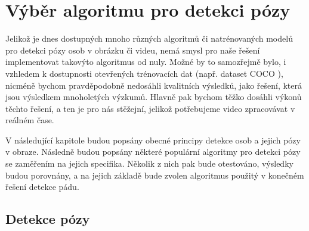 \chapter{Výběr algoritmu pro detekci pózy}
\label{chap:Pose}

Jelikož je dnes dostupných mnoho různých algoritmů či natrénovaných modelů pro
detekci pózy osob v obrázku či videu, nemá smysl pro naše řešení implementovat
takovýto algoritmus od nuly. Možné by to samozřejmě bylo, i vzhledem k
dostupnosti otevřených trénovacích dat (např. dataset COCO \cite{coco}),
nicméně bychom pravděpodobně nedosáhli kvalitních výsledků, jako řešení, která
jsou výsledkem mnoholetých výzkumů. Hlavně pak bychom těžko dosáhli výkonů
těchto řešení, a ten je pro nás stěžejní, jelikož potřebujeme video zpracovávat
v reálném čase.

V následující kapitole budou popsány obecné principy detekce osob a jejich pózy
v obraze. Následně budou popsány některé populární algoritmy pro detekci pózy
se zaměřením na jejich specifika. Několik z nich pak bude otestováno, výsledky
budou porovnány, a na jejich základě bude zvolen algoritmus použitý v konečném
řešení detekce pádu.

\section{Detekce pózy}

